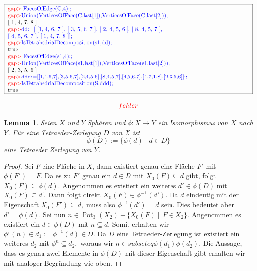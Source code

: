 \documentclass[12pt,titlepage,twoside,cleardoublepage]{article}
\theoremstyle{nummermitklammern}
\newtheorem{lemma}[temp]{Lemma}
\newtheorem{lemma}[zahl]{Lemma}
\numberwithin{equation}{section}
\DeclareMathOperator{\Pot}{Pot}
\begin{document}
 \begin{center}
 $\fbox{
\parbox{15cm}{
\textcolor{red}{gap$>$} \textcolor{blue}{FacesOfEdge(C,4);;}\newline 
\textcolor{red}{gap$>$}\textcolor{blue}{Union(VerticesOfFace(C,last[1]),VerticesOfFace(C,last[2]));}
\newline
 [ 1, 4, 7, 8 ]\newline 
\textcolor{red}{gap$>$}\textcolor{blue}{dd:=[ [1, 4, 6, 7 ], [ 3, 5, 6, 7 ], [ 2, 4, 5, 6 ], [ 8, 4, 5, 7 ],$ \newline $ [ 4, 5, 6, 7 ], [ 1,
4, 7, 8 ]];}\newline 
\textcolor{red}{gap$>$}\textcolor{blue}{ IsTetrahedrialDecomposition(s1,dd);}\newline 
true\newline 
\textcolor{red}{gap$>$} \textcolor{blue}{FacesOfEdge(s1,4);;}\newline 
\textcolor{red}{gap$>$}\textcolor{blue}{Union(VerticesOfFace(s1,last[1]),VerticesOfFace(s1,last[2]));}
\newline [ 2, 3, 5, 6 ]\newline 
\textcolor{red}{gap$>$}\textcolor{blue}{ddd:=[[1,4,6,7],[3,5,6,7],[2,4,5,6],[8,4,5,7],[4,5,6,7],[4,7,1,8],[2,3,5,6]];;}\newline 
\textcolor{red}{gap$>$}\textcolor{blue}{IsTetrahedrialDecomposition(S,ddd);}\newline 
true
 }}$
 \end{center}
\[
\textcolor{red}{fehler}
\]
\begin{lemma}
Seien $X$ und $Y$ Sphären und $\phi:X\to Y$ ein Isomorphismus von $X$ nach $Y$. Für eine Tetraeder-Zerlegung $D$ von $X$ ist \[
\phi(D):=\{\phi(d)\mid d\in D\}
\] eine Tetraeder Zerlegung von $Y$.
\end{lemma}
\begin{proof}
Sei $F$ eine Fläche in $X$, dann existiert genau eine Fläche $F'$ mit $\phi(F')=F.$
 Da es zu $F'$ genau ein $d\in D$ mit $X_0(F) \subseteq d$ gibt, folgt $X_0(F)\subseteq \phi(d).$
  Angenommen es existiert ein weiteres $d'\in \phi(D)$ mit $X_0(F)\subseteq d'$. Dann folgt direkt $X_0(F)\in \phi^{-1}(d').$
   Da $d$ eindeutig mit der Eigenschaft $X_0(F')\subseteq d,$ muss also $\phi^{-1}(d')=d$ sein. Dies bedeutet aber $d'=\phi(d).$ Sei nun $n\in \Pot_3(X_2)-\{X_0(F)\mid \,F \in X_2\}.$ Angenommen es existiert ein $d\in \phi(D)$ mit $n\subseteq d.$ Somit erhalten wir $\phi^{_1}(n)\in d_1:=\phi^{-1}(d)\in D.$ Da  $D$ eine Tetraeder-Zerlegung ist existiert ein weiteres $d_2$ mit $\phi^{n}\subseteq d_2,$ woraus wir $n\in subseteq \phi(d_1)\phi(d_2).$ Die Aussage, dass es genau zwei Elemente in $\phi(D)$ mit dieser Eigenschaft gibt erhalten wir mit analoger Begründung wie oben.  
\end{proof}
\end{document}
